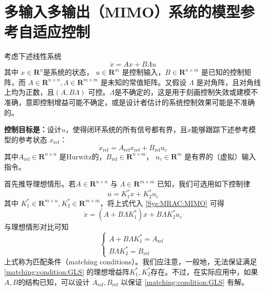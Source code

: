 \section{多输入多输出（MIMO）系统的模型参考自适应控制}\label{4Cref}
考虑下述线性系统
\begin{equation}
  \dot{x} = A  x + B \Lambda u\label{Sys:MRAC:MIMO}
\end{equation}
其中 $x \in \mathbf{R}^n$是系统的状态， $u \in \mathbf{R}^m$ 是控制输入，$B \in \mathbf{R}^{n \times m}$ 是已知的控制矩阵，而 $A \in \mathbf{R}^{n \times n}, \Lambda \in \mathbf{R}^{m \times m}$ 是未知的常值矩阵。又假设  $\Lambda$ 是对角阵，且对角线上均为正数，且$(A, B \Lambda)$ 可控。$\Lambda$是不确定的，这是用于刻画控制失效或建模不准确，意即控制增益可能不确定，或是设计者估计的系统控制效果可能是不准确的。

{\bf 控制目标是：}设计$u$，使得闭环系统的所有信号都有界，且$x$能够跟踪下述参考模型的参考状态 $x_{\ensuremath{\operatorname{ref}}}$：
 \begin{equation}
    \dot{x}_{\ensuremath{\operatorname{ref}}} =
    A_{\ensuremath{\operatorname{ref}}} x_{\ensuremath{\operatorname{ref}}} +
    B_{\ensuremath{\operatorname{ref}}} u_c\label{ideal_mimo}
  \end{equation}
其中$A_{\ensuremath{\operatorname{ref}}} \in \mathbf{R}^{n \times n}$ 是Hurwitz的，$B_{\ensuremath{\operatorname{ref}}} \in \mathbf{R}^{n \times m}$， $u_c \in \mathbf{R}^m$ 是有界的（虚拟）输入指令。

首先推导理想情形。若$A \in \mathbf{R}^{n \times n}$ 与 $\Lambda \in \mathbf{R}^{m\times m}$ 已知，我们可选用如下控制律
\[ u = K^{\ast}_1 x + K^{\ast}_2 u_c \]
其中 $K^{\ast}_1 \in \mathbf{R}^{m \times n}, K^{\ast}_2 \in \mathbf{R}^{m
\times m}$，将上式代入 \eqref{Sys:MRAC:MIMO} 可得
\[ \dot{x} = (A + B \Lambda K^{\ast}_1) x + B \Lambda K^{\ast}_2 u_c \]
与理想情形对比可知
\begin{equation}
  \left\{\begin{array}{l}
    A + B \Lambda K^{\ast}_1 = A_{\ensuremath{\operatorname{ref}}}\\
    B \Lambda K^{\ast}_2 = B_{\ensuremath{\operatorname{ref}}}
  \end{array}\right. \label{matching:condition:GLS}
\end{equation}
上式称为匹配条件（matching conditions）。我们应注意，一般地，无法保证满足 \eqref{matching:condition:GLS} 的理想增益阵$K^{\ast}_1, K^{\ast}_2$存在。不过，在实际应用中，如果$A, B$的结构已知，可以设计 $A_{\ensuremath{\operatorname{ref}}}, B_{\ensuremath{\operatorname{ref}}}$ 以保证 \eqref{matching:condition:GLS} 有解。


